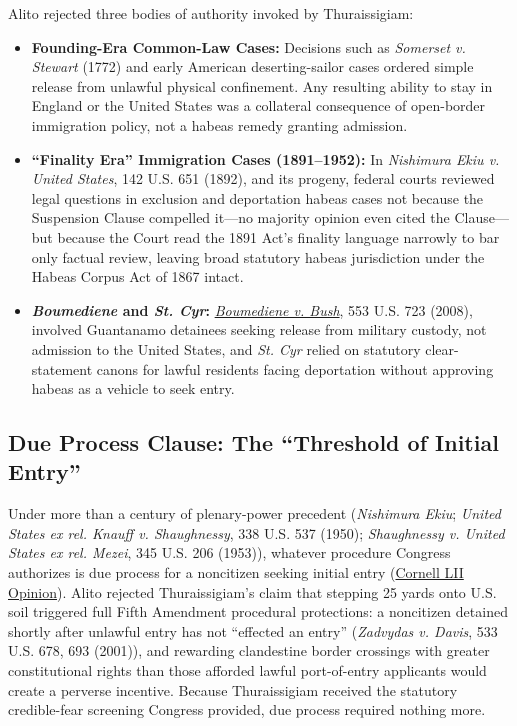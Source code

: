 \documentclass[12pt]{article}
\begin{document}
Alito rejected three bodies of authority invoked by Thuraissigiam:
\begin{itemize}
  \item \textbf{Founding-Era Common-Law Cases:} Decisions such as \textit{Somerset v. Stewart} (1772) and early American deserting-sailor cases ordered simple release from unlawful physical confinement. Any resulting ability to stay in England or the United States was a collateral consequence of open-border immigration policy, not a habeas remedy granting admission.
  \item \textbf{``Finality Era'' Immigration Cases (1891--1952):} In \textit{Nishimura Ekiu v. United States}, 142 U.S. 651 (1892), and its progeny, federal courts reviewed legal questions in exclusion and deportation habeas cases not because the Suspension Clause compelled it---no majority opinion even cited the Clause---but because the Court read the 1891 Act's finality language narrowly to bar only factual review, leaving broad statutory habeas jurisdiction under the Habeas Corpus Act of 1867 intact.
  \item \textbf{\textit{Boumediene} and \textit{St. Cyr}:} \href{https://supreme.justia.com/cases/federal/us/553/723/}{\textit{Boumediene v. Bush}}, 553 U.S. 723 (2008), involved Guantanamo detainees seeking release from military custody, not admission to the United States, and \textit{St. Cyr} relied on statutory clear-statement canons for lawful residents facing deportation without approving habeas as a vehicle to seek entry.
\end{itemize}

\subsection{Due Process Clause: The ``Threshold of Initial Entry''}
Under more than a century of plenary-power precedent (\textit{Nishimura Ekiu}; \textit{United States ex rel. Knauff v. Shaughnessy}, 338 U.S. 537 (1950); \textit{Shaughnessy v. United States ex rel. Mezei}, 345 U.S. 206 (1953)), whatever procedure Congress authorizes is due process for a noncitizen seeking initial entry (\href{https://www.law.cornell.edu/supremecourt/text/19-161}{Cornell LII Opinion}). Alito rejected Thuraissigiam's claim that stepping 25 yards onto U.S. soil triggered full Fifth Amendment procedural protections: a noncitizen detained shortly after unlawful entry has not ``effected an entry'' (\textit{Zadvydas v. Davis}, 533 U.S. 678, 693 (2001)), and rewarding clandestine border crossings with greater constitutional rights than those afforded lawful port-of-entry applicants would create a perverse incentive. Because Thuraissigiam received the statutory credible-fear screening Congress provided, due process required nothing more.
\end{document}

